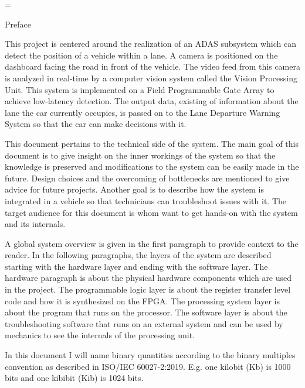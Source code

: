 \documentclass{matthijs}
\begin{document}
	\emergencystretch=\maxdimen

	\begin{hoofdstuk}{Preface}

		This project is centered around the realization of an ADAS subsystem which can detect the position of a vehicle within a lane.
		A camera is positioned on the dashboard facing the road in front of the vehicle.
		The video feed from this camera is analyzed in real-time by a computer vision system called the Vision Processing Unit.
		This system is implemented on a Field Programmable Gate Array to achieve low-latency detection.
		The output data, existing of information about the lane the car currently occupies, is passed on to the Lane Departure Warning System so that the car can make decisions with it.

		\bigskip

		This document pertains to the technical side of the system.
		The main goal of this document is to give insight on the inner workings of the system so that the knowledge is preserved and modifications to the system can be easily made in the future.
		Design choices and the overcoming of bottlenecks are mentioned to give advice for future projects.
		Another goal is to describe how the system is integrated in a vehicle so that technicians can troubleshoot issues with it.
		The target audience for this document is whom want to get hands-on with the system and its internals.

		\bigskip

		A global system overview is given in the first paragraph to provide context to the reader.
		In the following paragraphs, the layers of the system are described starting with the hardware layer and ending with the software layer.
		The hardware paragraph is about the physical hardware components which are used in the project.
		The programmable logic layer is about the register transfer level code and how it is synthesized on the FPGA.
		The processing system layer is about the program that runs on the processor.
		The software layer is about the troubleshooting software that runs on an external system and can be used by mechanics to see the internals of the processing unit.

		\bigskip

		In this document I will name binary quantities according to the binary multiples convention as described in ISO/IEC 60027-2:2019.
		E.g. one kilobit (Kb) is 1000 bits and one kibibit (Kib) is 1024 bits.

	\end{hoofdstuk}
\end{document}
